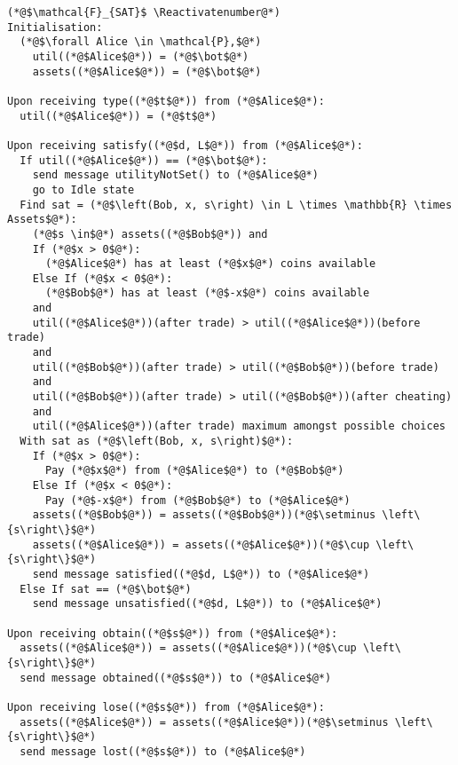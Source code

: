 \Suppressnumber
\begin{lstlisting}[label=satfunc, style=numbers]
(*@$\mathcal{F}_{SAT}$ \Reactivatenumber@*)
Initialisation:
  (*@$\forall Alice \in \mathcal{P},$@*)
    util((*@$Alice$@*)) = (*@$\bot$@*)
    assets((*@$Alice$@*)) = (*@$\bot$@*)

Upon receiving type((*@$t$@*)) from (*@$Alice$@*):
  util((*@$Alice$@*)) = (*@$t$@*)

Upon receiving satisfy((*@$d, L$@*)) from (*@$Alice$@*):
  If util((*@$Alice$@*)) == (*@$\bot$@*):
    send message utilityNotSet() to (*@$Alice$@*)
    go to Idle state
  Find sat = (*@$\left(Bob, x, s\right) \in L \times \mathbb{R} \times Assets$@*):
    (*@$s \in$@*) assets((*@$Bob$@*)) and
    If (*@$x > 0$@*):
      (*@$Alice$@*) has at least (*@$x$@*) coins available
    Else If (*@$x < 0$@*):
      (*@$Bob$@*) has at least (*@$-x$@*) coins available
    and
    util((*@$Alice$@*))(after trade) > util((*@$Alice$@*))(before trade)
    and
    util((*@$Bob$@*))(after trade) > util((*@$Bob$@*))(before trade)
    and
    util((*@$Bob$@*))(after trade) > util((*@$Bob$@*))(after cheating)
    and
    util((*@$Alice$@*))(after trade) maximum amongst possible choices
  With sat as (*@$\left(Bob, x, s\right)$@*):
    If (*@$x > 0$@*):
      Pay (*@$x$@*) from (*@$Alice$@*) to (*@$Bob$@*)
    Else If (*@$x < 0$@*):
      Pay (*@$-x$@*) from (*@$Bob$@*) to (*@$Alice$@*)
    assets((*@$Bob$@*)) = assets((*@$Bob$@*))(*@$\setminus \left\{s\right\}$@*)
    assets((*@$Alice$@*)) = assets((*@$Alice$@*))(*@$\cup \left\{s\right\}$@*)
    send message satisfied((*@$d, L$@*)) to (*@$Alice$@*)
  Else If sat == (*@$\bot$@*)
    send message unsatisfied((*@$d, L$@*)) to (*@$Alice$@*)

Upon receiving obtain((*@$s$@*)) from (*@$Alice$@*):
  assets((*@$Alice$@*)) = assets((*@$Alice$@*))(*@$\cup \left\{s\right\}$@*)
  send message obtained((*@$s$@*)) to (*@$Alice$@*)

Upon receiving lose((*@$s$@*)) from (*@$Alice$@*):
  assets((*@$Alice$@*)) = assets((*@$Alice$@*))(*@$\setminus \left\{s\right\}$@*)
  send message lost((*@$s$@*)) to (*@$Alice$@*)
\end{lstlisting}
